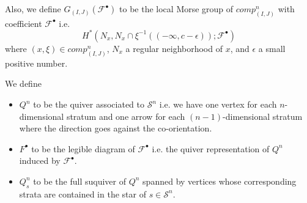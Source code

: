 Also, we define $G_{(I,J)}(\mathscr{F}^\bullet)$ to be the local Morse group of $comp^n_{(I,J)}$ with coefficient $\mathscr{F}^\bullet$ i.e.
\[
H^*(N_x,N_x\cap \xi^{-1}((-\infty,c-\epsilon));\mathscr{F}^\bullet)
\]
where $(x,\xi)\in comp^n_{(I,J)}$, $N_x$ a regular neighborhood of $x$, and $\epsilon$ a small positive number.
\begin{definition} 
We define
\begin{itemize}
\item $Q^n$ to be the quiver associated to $\mathcal{S}^n$ i.e. we have one vertex for each $n$-dimensional stratum and one arrow for each $(n-1)$-dimensional stratum where the direction goes against the co-orientation.

\item $F^\bullet$ to be the legible diagram of $\mathscr{F}^\bullet$ i.e. the quiver representation of $Q^n$ induced by $\mathscr{F}^\bullet$.

\item $Q_s^n$ to be the full suquiver of $Q^n$ spanned by vertices whose corresponding strata are contained in the star of $s\in \mathcal{S}^n$.
\end{itemize}
\end{definition}

